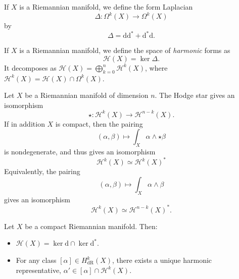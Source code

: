 \documentclass[12pt,letterpaper,reqno]{article}
\numberwithin{equation}{section}
\newcommand{\cH}{\ensuremath{\mathcal H}}
\newcommand{\de}{\mathrm{d}}
\newcommand{\dR}{\mathrm{dR}}
\newcommand{\ti}[1]{\textit{#1}}
\begin{document}
\begin{defn}
If $X$ is a Riemannian manifold, we define the form Laplacian
\begin{equation}
  \Delta: \Omega^k(X) \to \Omega^k(X)
\end{equation}
by
\begin{equation}
  \Delta = \de \de^* + \de^* \de.
\end{equation}
\end{defn}

\begin{defn}
If $X$ is a Riemannian manifold, we define the space of
\ti{harmonic} forms as
\begin{equation}
  \cH(X) = \ker \Delta.
\end{equation}
It decomposes as $\cH(X) = \bigoplus_{k=0}^n \cH^k(X)$,
where $\cH^k(X) = \cH(X) \cap \Omega^k(X)$.
\end{defn}

\begin{prop} \label{prop:poincare-duality}
Let $X$ be a Riemannian manifold of dimension $n$.
The Hodge star gives an isomorphism
\begin{equation}
  \star: \cH^k(X) \to \cH^{n-k}(X).
\end{equation}
If in addition $X$ is compact, then the pairing
\begin{equation}
	(\alpha,\beta) \mapsto \int_X \alpha \wedge \star \beta
\end{equation}
is nondegenerate, and thus gives an isomorphism
\begin{equation}
  \cH^k(X) \simeq \cH^k(X)^*
\end{equation}
Equivalently, the pairing
\begin{equation}
(\alpha, \beta) \mapsto \int_X \alpha \wedge \beta
\end{equation}
gives an isomorphism
\begin{equation}
	\cH^k(X) \simeq \cH^{n-k}(X)^*.
\end{equation}
\end{prop}

\begin{thm}
\label{thm:abelian-hodge-riemannian}
Let $X$ be a compact Riemannian manifold. Then:
\begin{itemize}
\item $\cH(X) = \ker \de \cap \ker \de^*$.
\item For any class
$[\alpha] \in H^k_\dR(X)$, there exists a unique harmonic
representative, $\alpha' \in [\alpha] \cap \cH^k(X)$.
\end{itemize}
\end{thm}
\end{document}
